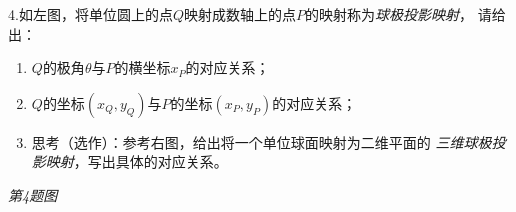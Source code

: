 \bs
4.如左图，将单位圆上的点$Q$映射成数轴上的点$P$的映射称为{\it 球极投影映射}，
  请给出：
  \begin{enumerate}[(1)]
    \item $Q$的极角$\theta$与$P$的横坐标$x_P$的对应关系；
    \item $Q$的坐标$(x_Q,y_Q)$与$P$的坐标$(x_P,y_P)$的对应关系；
    \item 思考（选作）：参考右图，给出将一个单位球面映射为二维平面的
    {\it 三维球极投影映射}，写出具体的对应关系。
  \end{enumerate}
\begin{center}
	\quad
	
	\it \small 第4题图
\end{center}

